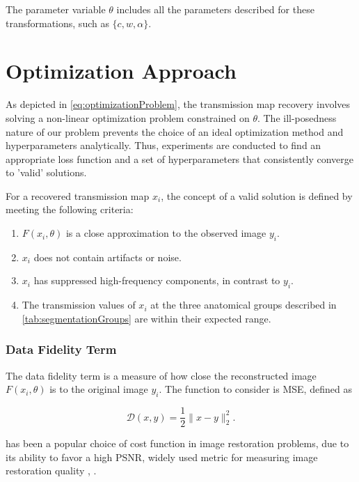 \documentclass[nomenclature, english, bibtex]{kththesis}
\numberwithin{listing}{chapter}
\begin{document}
The parameter variable $\theta$ includes all the parameters described for these transformations, such as $\{c, w, \alpha\}$.

\section{Optimization Approach}
\label{sec:optimization}

As depicted in \autoref{eq:optimizationProblem}, the transmission map recovery involves solving a
non-linear optimization problem constrained on $\theta$. The ill-posedness nature of our
problem prevents the choice of an ideal optimization method and hyperparameters
analytically. Thus, experiments are conducted to find an appropriate loss function and a set of hyperparameters
that consistently converge to 'valid' solutions.

For a recovered transmission map $x_i$, the concept of a valid solution is defined by meeting the following criteria:

\begin{enumerate}
    \item $F(x_i, \theta)$ is a close approximation to the observed image $y_i$.
    \item $x_i$ does not contain artifacts or noise.
    \item $x_i$ has suppressed high-frequency components, in contrast to $y_i$.
    \item The transmission values of $x_i$ at the three anatomical groups described in \autoref{tab:segmentationGroups}
    are within their expected range.
\end{enumerate}

\subsubsection{Data Fidelity Term}

The data fidelity term is a measure of how close the reconstructed image $F(x_i, \theta)$ is to the original image $y_i$.
The function to consider is \acrfull{MSE}, defined as

\begin{equation}
    \mathcal{D}(x, y) = \frac{1}{2} \lVert x - y \rVert_2^2.
\end{equation}

 has been a popular choice of cost function in image restoration problems, due to its ability to favor a
high \acrfull{PSNR}, widely used metric for measuring image restoration quality \cite[p.~1]{zhaoLossFunctionsImage2017}, \cite[p.~191]{fleetComputerVisionECCV2014}.
\end{document}
